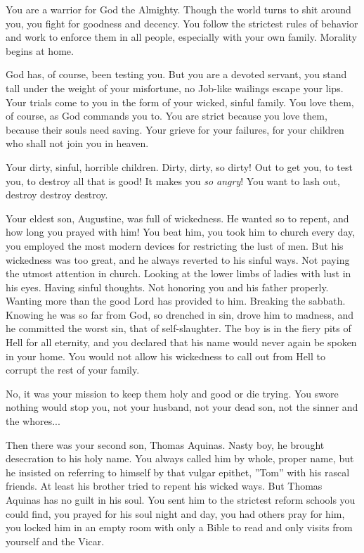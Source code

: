 \documentclass[char]{airship}
\begin{document}
\name{\cJack{}}


You are a warrior for God the Almighty. Though the world turns to shit
around you, you fight for goodness and decency. You follow the
strictest rules of behavior and work to enforce them in all people,
especially with your own family. Morality begins at home.

God has, of course, been testing you. But you are a devoted servant,
you stand tall under the weight of your misfortune, no Job-like
wailings escape your lips. Your trials come to you in the form of your
wicked, sinful family. You love them, of course, as God commands you
to. You are strict because you love them, because their souls need
saving. Your grieve for your failures, for your children who shall not
join you in heaven. 

Your dirty, sinful, horrible children. Dirty, dirty, so dirty! Out to
get you, to test you, to destroy all that is good! It makes you {\em
so angry}! You want to lash out, destroy destroy destroy.

Your eldest son, Augustine, was full of wickedness. He wanted so to
repent, and how long you prayed with him! You beat him, you took him
to church every day, you employed the most modern devices for
restricting the lust of men. But his wickedness was too great, and he
always reverted to his sinful ways. Not paying the utmost attention in
church. Looking at the lower limbs of ladies with lust in his
eyes. Having sinful thoughts. Not honoring you and his father
properly. Wanting more than the good Lord has provided to
him. Breaking the sabbath. Knowing he was so far from God, so drenched
in sin, drove him to madness, and he committed the worst sin, that of
self-slaughter. The boy is in the fiery pits of Hell for all eternity,
and you declared that his name would never again be spoken in your
home. You would not allow his wickedness to call out from Hell to
corrupt the rest of your family.

No, it was your mission to keep them holy and good or die trying. You
swore nothing would stop you, not your husband, not your dead son, not
the sinner and the whores...

Then there was your second son, Thomas Aquinas. Nasty boy, he brought
desecration to his holy name. You always called him by whole, proper
name, but he insisted on referring to himself by that vulgar epithet,
''Tom'' with his rascal friends. At least his brother tried to repent
his wicked ways. But Thomas Aquinas has no guilt in his soul. You sent
him to the strictest reform schools you could find, you prayed for his
soul night and day, you had others pray for him, you locked him in an
empty room with only a Bible to read and only visits from yourself and
the Vicar.
\end{document}
